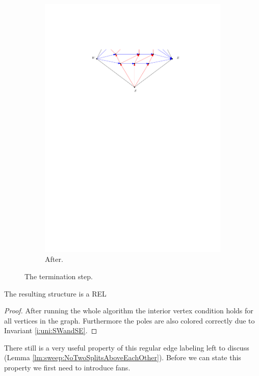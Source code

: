 \begin{figure}[h]
\begin{subfigure}[b]{0.45 \textwidth}
        \includegraphics[width =\textwidth]{unifiedAlgo/img/sweep/terminateAfter.pdf}
        \caption{After.}
    \end{subfigure}
    \caption{The termination step.}
    \label{fig:sweep:terminate}
  \end{figure}

  \begin{lemma}
    \label{lm:sweep:REL}
    The resulting structure is a REL
  \end{lemma}

  \begin{proof}
    After running the whole algorithm the interior vertex condition holds for all vertices in the graph. Furthermore the poles are also colored correctly due to Invariant \ref{i:uni:SWandSE}.
  \end{proof}


    There still is a very useful property of this regular edge labeling left to discuss (Lemma \ref{lm:sweep:NoTwoSplitsAboveEachOther}). Before we can state this property we first need to introduce fans.


